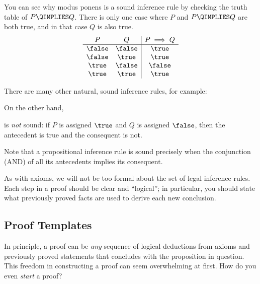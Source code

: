 You can see why modus ponens is a sound inference rule by checking the
truth table of $P\QIMPLIES Q$.  There is only one case where $P$ and
$P \QIMPLIES Q$ are both true, and in that case $Q$ is also true.
\[
\begin{array}{cc|c}
P & Q & P \implies Q \\ \hline
\false & \false & \true \\
\false & \true  & \true \\
\true  & \false & \false \\
\true  & \true  & \true \\
\end{array}
\]

There are many other natural, sound inference rules, for example:
\begin{rul}\label{rule:transitivity}
\end{rul}

\begin{rul}
\end{rul}

\begin{rul}
\end{rul}

On the other hand,
\begin{rul*}
\end{rul*}
\noindent is \emph{not} sound: if $P$ is assigned $\true$ and $Q$ is assigned
$\false$, then the antecedent is true and the consequent is not.

Note that a propositional inference rule is sound precisely when the conjunction
(AND) of all its antecedents implies its consequent.

As with axioms, we will not be too formal about the set of legal inference
rules.  Each step in a proof should be clear and ``logical''; in
particular, you should state what previously proved facts are used to
derive each new conclusion.

\subsection{Proof Templates}

In principle, a proof can be \emph{any} sequence of logical
deductions from axioms and previously proved statements that concludes
with the proposition in question.  This freedom in constructing a
proof can seem overwhelming at first.  How do you even \emph{start}
a proof?

